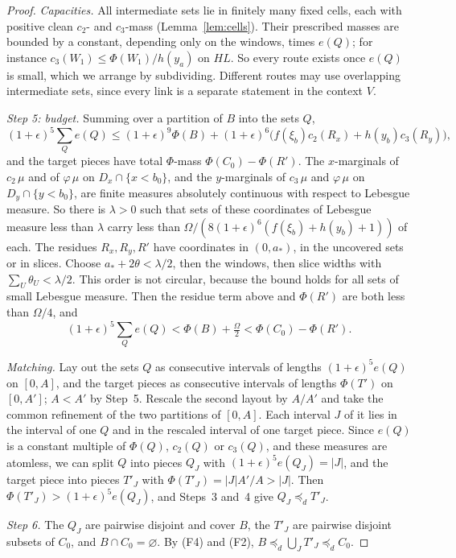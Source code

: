 \documentclass[11pt]{article}
\theoremstyle{definition}\newtheorem{definition}[theorem]{Definition}
\theoremstyle{remark}\newtheorem{remark}[theorem]{Remark}
\begin{document}
\begin{proof}
\emph{Capacities.} All intermediate sets lie in finitely many fixed cells,
each with positive clean $c_2$- and $c_3$-mass (Lemma~\ref{lem:cells}). Their
prescribed masses are bounded by a constant, depending only on the windows,
times $e(Q)$; for instance $c_3(W_1)\le\Phi(W_1)/h(y_a)$ on $HL$. So every
route exists once $e(Q)$ is small, which we arrange by subdividing. Different
routes may use overlapping intermediate sets, since every link is a separate
statement in the context $V$.

\emph{Step 5: budget.} Summing over a partition of $B$ into the sets $Q$,
\[
 (1+\epsilon)^5\sum_Qe(Q)\le(1+\epsilon)^9\Phi(B)
 +(1+\epsilon)^6\bigl(f(\xi_b)c_2(R_x)+h(y_b)c_3(R_y)\bigr),
\]
and the target pieces have total $\Phi$-mass $\Phi(C_0)-\Phi(R')$. The
$x$-marginals of $c_2\,\mu$ and of $\varphi\,\mu$ on $D_x\cap\{x<b_0\}$, and
the $y$-marginals of $c_3\,\mu$ and $\varphi\,\mu$ on $D_y\cap\{y<b_0\}$, are
finite measures absolutely continuous with respect to Lebesgue measure. So
there is $\lambda>0$ such that sets of these coordinates of Lebesgue measure
less than $\lambda$ carry less than $\Omega/(8(1+\epsilon)^6(f(\xi_b)+
h(y_b)+1))$ of each. The residues $R_x,R_y,R'$ have coordinates in
$(0,a_*)$, in the uncovered sets or in slices. Choose $a_*+2\theta<
\lambda/2$, then the windows, then slice widths with $\sum_U\theta_U<
\lambda/2$. This order is not circular, because the bound holds for all sets
of small Lebesgue measure. Then the residue term above and $\Phi(R')$ are both
less than $\Omega/4$, and
\[
 (1+\epsilon)^5\sum_Qe(Q)<\Phi(B)+\tfrac{\Omega}{2}<\Phi(C_0)-\Phi(R').
\]

\emph{Matching.} Lay out the sets $Q$ as consecutive intervals of lengths
$(1+\epsilon)^5e(Q)$ on $[0,A]$, and the target pieces as consecutive
intervals of lengths $\Phi(T')$ on $[0,A']$; $A<A'$ by Step~5. Rescale the
second layout by $A/A'$ and take the common refinement of the two partitions
of $[0,A]$. Each interval $J$ of it lies in the interval of one $Q$ and in the
rescaled interval of one target piece. Since $e(Q)$ is a constant multiple of
$\Phi(Q)$, $c_2(Q)$ or $c_3(Q)$, and these measures are atomless, we can split
$Q$ into pieces $Q_J$ with $(1+\epsilon)^5e(Q_J)=|J|$, and the target piece
into pieces $T'_J$ with $\Phi(T'_J)=|J|A'/A>|J|$. Then
$\Phi(T'_J)>(1+\epsilon)^5e(Q_J)$, and Steps~3 and~4 give $Q_J\preceq_dT'_J$.

\emph{Step 6.} The $Q_J$ are pairwise disjoint and cover $B$, the $T'_J$ are
pairwise disjoint subsets of $C_0$, and $B\cap C_0=\varnothing$. By (F4) and
(F2), $B\preceq_d\bigcup_JT'_J\preceq_dC_0$.
\end{proof}
\end{document}
